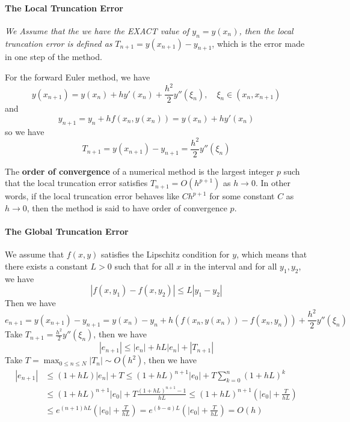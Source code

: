 \documentclass{matharticle}
\begin{document}
\paragraph{The Local Truncation Error}
\emph{We Assume that the we have the EXACT value of $y_n = y(x_n)$, then the local truncation error is defined as} $T_{n+1} = y(x_{n+1}) - y_{n+1}$, which is the error made in one step of the method.

For the forward Euler method, we have
\begin{equation*}
	y(x_{n+1}) = y(x_n) + h y'(x_n) + \frac{h^2}{2} y''(\xi_n), \quad \xi_n \in (x_n, x_{n+1})
\end{equation*}
and
\begin{equation*}
	y_{n+1} = y_n + h f(x_n, y(x_n)) = y(x_n) + h y'(x_n)
\end{equation*}
so we have
\begin{equation}
	T_{n+1} = y(x_{n+1}) - y_{n+1} = \frac{h^2}{2} y''(\xi_n)
\end{equation}

\begin{definition}
	The \textbf{order of convergence} of a numerical method is the largest integer $p$ such that the local truncation error satisfies $T_{n+1} = O(h^{p+1})$ as $h \to 0$. In other words, if the local truncation error behaves like $C h^{p+1}$ for some constant $C$ as $h \to 0$, then the method is said to have order of convergence $p$.
\end{definition}

\paragraph{The Global Truncation Error}
We assume that $f(x,y)$ satisfies the Lipschitz condition for $y$, which means that there exists a constant $L > 0$ such that for all $x$ in the interval and for all $y_1, y_2$, we have
\begin{equation}
	|f(x, y_1) - f(x, y_2)| \leq L |y_1 - y_2|
\end{equation}
Then we have
\begin{equation*}
	e_{n+1} = y(x_{n+1}) - y_{n+1} = y(x_n) - y_n + h (f(x_n, y(x_n)) - f(x_n, y_n)) + \frac{h^2}{2} y''(\xi_n)
\end{equation*}
Take $T_{n+1} = \frac{h^2}{2} y''(\xi_n)$, then we have
\begin{equation*}
	|e_{n+1}| \leq |e_n| + h L |e_n| + |T_{n+1}|
\end{equation*}
Take $T = \max_{0 \leq n \leq N} |T_n| \sim O(h^2)$, then we have
\begin{equation*}
	\begin{aligned}
		|e_{n+1}| & \leq (1 + h L) |e_n| + T \leq (1 + h L)^{n+1} |e_0| + T \sum_{k=0}^{n} (1 + h L)^k                                       \\
		          & \leq (1 + h L)^{n+1} |e_0| + T \frac{(1 + h L)^{n+1} - 1}{h L} \leq (1 + h L)^{n+1} \left( |e_0| + \frac{T}{h L} \right) \\
		          & \leq e^{(n+1) h L} \left( |e_0| + \frac{T}{h L} \right) = e^{(b - a) L} \left( |e_0| + \frac{T}{h L} \right) = O(h)
	\end{aligned}
\end{equation*}
\end{document}
